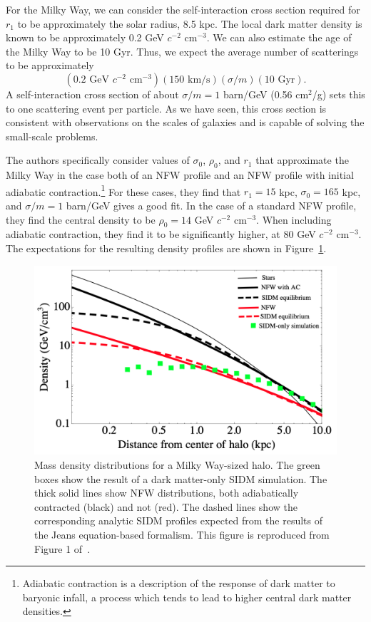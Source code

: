 For the Milky Way, we can consider the self-interaction cross section required
for $r_1$ to be approximately the solar radius, 8.5 kpc. The local dark matter
density is known to be approximately 0.2 GeV $c^{-2}$ cm$^{-3}$. We can also
estimate the age of the Milky Way to be 10 Gyr. Thus, we expect the average
number of scatterings to be approximately
\begin{equation}
    \left( 0.2 \text{ GeV $c^{-2}$ cm$^{-3}$} \right)
    \left( 150 \text{ km/s} \right)
    \left( \sigma/m \right)
    \left( 10 \text{ Gyr} \right).
\end{equation}
A self-interaction cross section of about $\sigma/m = 1$ barn/GeV (0.56
cm$^2$/g) sets this to one scattering event per particle. As we have seen, this
cross section is consistent with observations on the scales of galaxies and is
capable of solving the small-scale problems.

The authors specifically consider values of $\sigma_0$, $\rho_0$, and $r_1$
that approximate the Milky Way in the case both of an NFW profile and an NFW
profile with initial adiabatic contraction.\footnote{Adiabatic contraction is a
description of the response of dark matter to baryonic infall, a process which
tends to lead to higher central dark matter densities.} For these cases, they
find that $r_1 = 15$ kpc, $\sigma_0 = 165$ kpc, and $\sigma / m = 1$ barn/GeV
gives a good fit. In the case of a standard NFW profile, they find the central
density to be $\rho_0 = 14$ GeV $c^{-2}$ cm$^{-3}$. When including adiabatic
contraction, they find it to be significantly higher, at 80 GeV $c^{-2}$
cm$^{-3}$. The expectations for the resulting density profiles are shown in
Figure~\ref{fig:sidm_expected_density}.

\begin{figure}
    \centering
    \includegraphics[width=0.65\linewidth]{figs/kaplinghat_sidm_density.png}
    \caption{%
        Mass density distributions for a Milky Way-sized halo. The green boxes
        show the result of a dark matter-only SIDM simulation. The thick solid
        lines show NFW distributions, both adiabatically contracted (black)
        and not (red). The dashed lines show the corresponding analytic SIDM
        profiles expected from the results of the Jeans equation-based
        formalism. This figure is reproduced from Figure 1
        of~\cite{kaplinghat_tying_2014}.
    }
    \label{fig:sidm_expected_density}
\end{figure}

